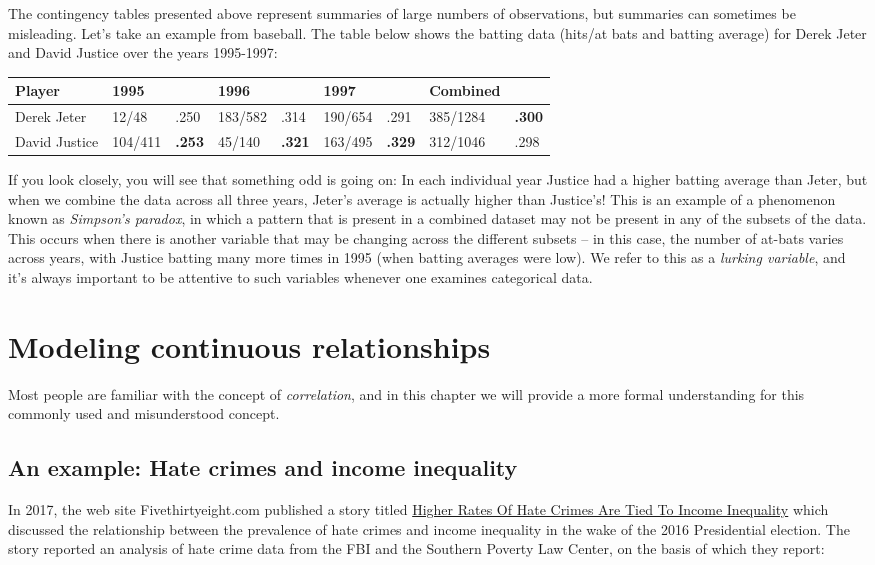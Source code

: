 \documentclass[]{book}
\theoremstyle{definition}
\theoremstyle{definition}
\theoremstyle{definition}
\theoremstyle{remark}
\begin{document}
The contingency tables presented above represent summaries of large
numbers of observations, but summaries can sometimes be misleading.
Let's take an example from baseball. The table below shows the batting
data (hits/at bats and batting average) for Derek Jeter and David
Justice over the years 1995-1997:

\begin{longtable}[]{@{}lllllllll@{}}
\toprule
Player & 1995 & & 1996 & & 1997 & & Combined &\tabularnewline
\midrule
\endhead
Derek Jeter & 12/48 & .250 & 183/582 & .314 & 190/654 & .291 & 385/1284
& \textbf{.300}\tabularnewline
David Justice & 104/411 & \textbf{.253} & 45/140 & \textbf{.321} &
163/495 & \textbf{.329} & 312/1046 & .298\tabularnewline
\bottomrule
\end{longtable}

If you look closely, you will see that something odd is going on: In
each individual year Justice had a higher batting average than Jeter,
but when we combine the data across all three years, Jeter's average is
actually higher than Justice's! This is an example of a phenomenon known
as \emph{Simpson's paradox}, in which a pattern that is present in a
combined dataset may not be present in any of the subsets of the data.
This occurs when there is another variable that may be changing across
the different subsets -- in this case, the number of at-bats varies
across years, with Justice batting many more times in 1995 (when batting
averages were low). We refer to this as a \emph{lurking variable}, and
it's always important to be attentive to such variables whenever one
examines categorical data.

\chapter{Modeling continuous
relationships}\label{modeling-continuous-relationships}

Most people are familiar with the concept of \emph{correlation}, and in
this chapter we will provide a more formal understanding for this
commonly used and misunderstood concept.

\section{An example: Hate crimes and income
inequality}\label{an-example-hate-crimes-and-income-inequality}

In 2017, the web site Fivethirtyeight.com published a story titled
\href{https://fivethirtyeight.com/features/higher-rates-of-hate-crimes-are-tied-to-income-inequality/}{Higher
Rates Of Hate Crimes Are Tied To Income Inequality} which discussed the
relationship between the prevalence of hate crimes and income inequality
in the wake of the 2016 Presidential election. The story reported an
analysis of hate crime data from the FBI and the Southern Poverty Law
Center, on the basis of which they report:
\end{document}
